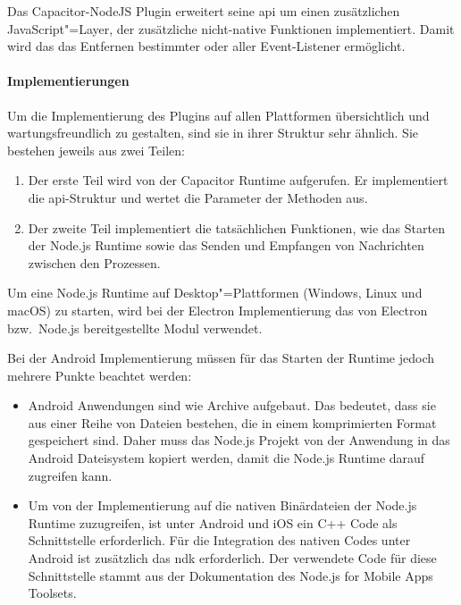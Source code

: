 Das Capacitor-NodeJS Plugin erweitert seine \ac{api} um einen zusätzlichen JavaScript"=Layer, der zusätzliche nicht-native Funktionen implementiert.
Damit wird das das Entfernen bestimmter oder aller Event-Listener ermöglicht.

\paragraph{Implementierungen}

Um die Implementierung des Plugins auf allen Plattformen übersichtlich und wartungsfreundlich zu gestalten, sind sie in ihrer Struktur sehr ähnlich.
Sie bestehen jeweils aus zwei Teilen:

\begin{enumerate}
  \item 
  Der erste Teil wird von der Capacitor Runtime aufgerufen.
  Er implementiert die \acs{api}-Struktur und wertet die Parameter der Methoden aus.
  \item 
  Der zweite Teil implementiert die tatsächlichen Funktionen,
  wie das Starten der Node.js Runtime sowie das Senden und Empfangen von Nachrichten zwischen den Prozessen.
\end{enumerate}

Um eine Node.js Runtime auf Desktop"=Plattformen (Windows, Linux und macOS) zu starten, wird bei der Electron Implementierung das von Electron bzw.\ Node.js bereitgestellte Modul  verwendet.
\cite{electron:docs}

Bei der Android Implementierung müssen für das Starten der Runtime jedoch mehrere Punkte beachtet werden:

\begin{itemize}
  \item
  Android Anwendungen sind wie Archive aufgebaut.
  Das bedeutet, dass sie aus einer Reihe von Dateien bestehen, die in einem komprimierten Format gespeichert sind.
  Daher muss das Node.js Projekt von der Anwendung in das Android Dateisystem kopiert werden, damit die Node.js Runtime darauf zugreifen kann.
  \cite{nodejs-mobile:docs}

  \item 
  Um von der Implementierung auf die nativen Binärdateien der Node.js Runtime zuzugreifen, ist unter Android und iOS ein C++ Code als Schnittstelle erforderlich.
  Für die Integration des nativen Codes unter Android ist zusätzlich das \ac{ndk} erforderlich.
  Der verwendete Code für diese Schnittstelle stammt aus der Dokumentation des Node.js for Mobile Apps Toolsets.
  \cite{nodejs-mobile:docs}
\end{itemize}

